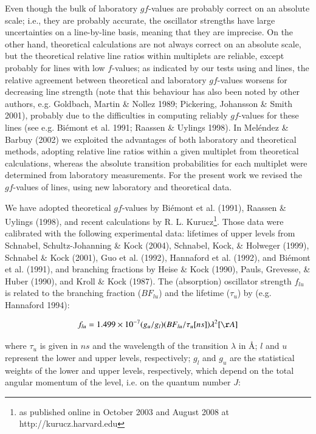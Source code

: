 \documentclass[traditabstract]{aa} %
\begin{document}
Even though the bulk of laboratory $gf$-values are probably correct 
on an absolute scale; i.e., they are probably accurate, the oscillator 
strengths have large uncertainties on a line-by-line basis, meaning that they
are imprecise. On the other hand, theoretical calculations are 
not always correct on an absolute scale, but the theoretical relative line 
ratios within multiplets are reliable, except probably for 
lines with low $f$-values;
as indicated by our tests using  and  lines,
the relative agreement between theoretical
and laboratory $gf$-values worsens for decreasing line strength
(note that this behaviour has also been noted by other authors, e.g. 
Goldbach, Martin \& Nollez 1989; Pickering, Johansson \& Smith 2001),
probably due to the difficulties in computing reliably $gf$-values for these
lines (see e.g. Bi\'emont et al. 1991; Raassen \& Uylings 1998).
In Mel\'endez \& Barbuy (2002) we
exploited the advantages of both laboratory and theoretical methods, 
adopting  relative line ratios within a given multiplet 
from theoretical calculations, whereas the absolute transition
probabilities for each multiplet were determined from laboratory measurements.
For the present work we revised the $gf$-values of  lines,
using new laboratory and theoretical data.

We have adopted theoretical $gf$-values by Bi\'emont et al. (1991),
Raassen \& Uylings (1998), and recent calculations
by R. L. Kurucz\footnote{as published online in October 2003 and 
August 2008 at http://kurucz.harvard.edu}. Those data were calibrated with 
the following experimental data: lifetimes of upper levels from
Schnabel, Schultz-Johanning \& Kock (2004), 
Schnabel, Kock, \& Holweger (1999), Schnabel \& Kock (2001), 
Guo et al. (1992), Hannaford et al. (1992), and Bi\'emont et al.
(1991), and branching fractions by Heise \& Kock (1990), Pauls,
Grevesse, \& Huber (1990), and Kroll \& Kock (1987). The (absorption)
oscillator strength $f_{lu}$ is related to the branching fraction ($BF_{lu}$)
and the lifetime ($\tau_u$) by (e.g. Hannaford 1994):

\begin{equation}
 f_{lu} = 1.499 \times 10^{-7} (g_u/g_l) (BF_{lu}/\tau_u[ns]) \lambda^2[\AA]
\end{equation}

\noindent where $\tau_u$ is given in $ns$ and 
the wavelength of the transition $\lambda$ in \AA; 
$l$ and $u$ represent the lower and upper levels, respectively; 
$g_l$ and $g_u$ are the statistical weights of the lower and upper levels,
respectively, which depend on the total angular momentum of the level, i.e. on the 
quantum number $J$:
\end{document}
